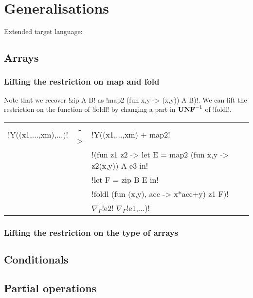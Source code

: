\section{Generalisations}
\label{sec:generalisation}


% 

% 

Extended target language:

% 

% 

\subsection{Arrays}

\subsubsection{Lifting the restriction on map and fold}
\label{ssub:Lifting the restriction on map and fold}

Note that we recover !zip A B! as !map2 (fun x,y -> (x,y)) A B)!. 
We can lift the restriction on the function of !foldl! by changing a part in $\mathbf{UNF}^{-1}$ of !foldl!.
\begin{center}
\begin{tabular}{r c l}
    !Y((x1,...,xm),...)! & -> &  !Y((x1,...,xm) + map2! \\
        && !(fun z1 z2 -> let E = map2 (fun x,y -> z2(x,y)) A e3 in! \\
        &&  !let F = zip B E in!\\
        && !foldl (fun (x,y), acc  -> x*acc+y) z1 F)! \\
        && $\nabla_{\Gamma}$!e2! $\nabla_{\Gamma}$!e1,...)!
\end{tabular}
\end{center}

\subsubsection{Lifting the restriction on the type of arrays}
\label{ssub:Lifting the restriction on the type of arrays}


\subsection{Conditionals} 



\subsection{Partial operations} 


